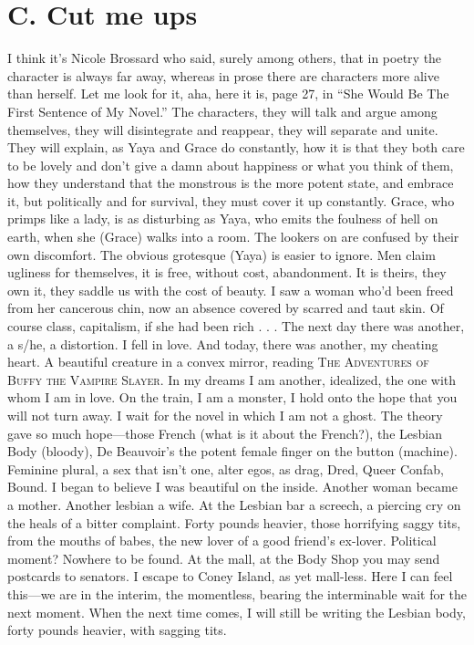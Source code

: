 \documentclass[
]{memoir}
\begin{document}
\hypertarget{c.-cut-me-ups}{%
\section*{C. Cut me ups}\label{c.-cut-me-ups}}

I think it's Nicole Brossard who said, surely among others, that in
poetry the character is always far away, whereas in prose there are
characters more alive than herself. Let me look for it, aha, here it is,
page 27, in ``She Would Be The First Sentence of My Novel.'' The
characters, they will talk and argue among themselves, they will
disintegrate and reappear, they will separate and unite. They will
explain, as Yaya and Grace do constantly, how it is that they both care
to be lovely and don't give a damn about happiness or what you think of
them, how they understand that the monstrous is the more potent state,
and embrace it, but politically and for survival, they must cover it up
constantly. Grace, who primps like a lady, is as disturbing as Yaya, who
emits the foulness of hell on earth, when she (Grace) walks into a room.
The lookers on are confused by their own discomfort. The obvious
grotesque (Yaya) is easier to ignore. Men claim ugliness for themselves,
it is free, without cost, abandonment. It is theirs, they own it, they
saddle us with the cost of beauty. I saw a woman who'd been freed from
her cancerous chin, now an absence covered by scarred and taut skin. Of
course class, capitalism, if she had been rich . . . The next day there
was another, a s/he, a distortion. I fell in love. And today, there was
another, my cheating heart. A beautiful creature in a convex mirror,
reading \textsc{The Adventures of Buffy the Vampire Slayer}. In my
dreams I am another, idealized, the one with whom I am in love. On the
train, I am a monster, I hold onto the hope that you will not turn away.
I wait for the novel in which I am not a ghost. The theory gave so much
hope---those French (what is it about the French?), the Lesbian Body
(bloody), De Beauvoir's the potent female finger on the button
(machine). Feminine plural, a sex that isn't one, alter egos, as drag,
Dred, Queer Confab, Bound. I began to believe I was beautiful on the
inside. Another woman became a mother. Another lesbian a wife. At the
Lesbian bar a screech, a piercing cry on the heals of a bitter
complaint. Forty pounds heavier, those horrifying saggy tits, from the
mouths of babes, the new lover of a good friend's ex-lover. Political
moment? Nowhere to be found. At the mall, at the Body Shop you may send
postcards to senators. I escape to Coney Island, as yet mall-less. Here
I can feel this---we are in the interim, the momentless, bearing the
interminable wait for the next moment. When the next time comes, I will
still be writing the Lesbian body, forty pounds heavier, with sagging
tits.
\end{document}
